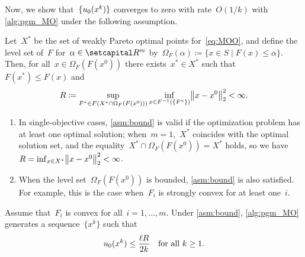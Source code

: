 \documentclass[../../main]{subfiles}
\begin{document}
Now, we show that~$\lbrace u_0(x^k)\rbrace$ converges to zero with rate~$O(1 / k)$ with \cref{alg:pgm_MO} under the following assumption.
\begin{assumption} \label{asm:bound}
    Let~$X^\ast$ be the set of weakly Pareto optimal points for~\cref{eq:MOO}, and define the level set of~$F$ for~$\alpha \in \setR^m$ by~$\Omega_F(\alpha) \coloneqq \{ x \in S \mid F(x) \le \alpha \}$.
    Then, for all~$x \in \Omega_F(F(x^0))$ there exists~$x^\ast \in X^\ast$ such that~$F(x^\ast) \le F(x)$ and
    \[ \label{eq:R}
        R \coloneqq \sup_{F^\ast \in F(X^\ast \cap \Omega_F(F(x^0)))} \inf_{x \in F^{-1}(\set*{F^\ast})} \norm*{x - x^0}_2^2 < \infty
    .\]
\end{assumption}
\begin{remark}
    \begin{enumerate}
        \item In single-objective cases, \cref{asm:bound} is valid if the optimization problem has at least one optimal solution; when~$m = 1$,~$X^\ast$ coincides with the optimal solution set, and the equality~$X^\ast \cap \Omega_F(F(x^0)) = X^\ast$ holds, so we have~$R = \inf_{x \in X^\ast} \norm*{x - x^0}_2^2 < \infty$.
        \item When the level set~$\Omega_F(F(x^0))$ is bounded, \cref{asm:bound} is also satisfied.
            For example, this is the case when~$F_i$ is strongly convex for at least one~$i$.
    \end{enumerate}
\end{remark}
\begin{theorem} \label{thm:pgm_rate_convex}
	Assume that~$F_i$ is convex for all~$i = 1, \dots, m$.
    Under \cref{asm:bound}, \cref{alg:pgm_MO} generates a sequence~$\{ x^k \}$ such that
    \[
        u_0(x^k) \le \frac{\ell R}{2 k} \quad \text{for all~$k \ge 1$}.
    \]
\end{theorem}
\end{document}
